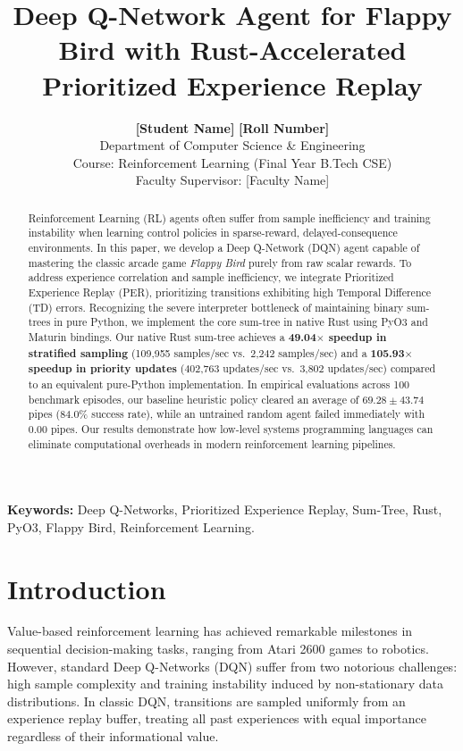 \documentclass[12pt,a4paper]{article}
\title{\textbf{\Large Deep Q-Network Agent for Flappy Bird with Rust-Accelerated Prioritized Experience Replay}}
\author{
    \textbf{[Student Name]} \quad \textbf{[Roll Number]} \\
    Department of Computer Science \& Engineering \\
    Course: Reinforcement Learning (Final Year B.Tech CSE) \\
    Faculty Supervisor: [Faculty Name]
}
\date{}
\begin{document}
\maketitle
\thispagestyle{empty}

\begin{abstract}
Reinforcement Learning (RL) agents often suffer from sample inefficiency and training instability when learning control policies in sparse-reward, delayed-consequence environments. In this paper, we develop a Deep Q-Network (DQN) agent capable of mastering the classic arcade game \textit{Flappy Bird} purely from raw scalar rewards. To address experience correlation and sample inefficiency, we integrate Prioritized Experience Replay (PER), prioritizing transitions exhibiting high Temporal Difference (TD) errors. Recognizing the severe interpreter bottleneck of maintaining binary sum-trees in pure Python, we implement the core sum-tree in native Rust using PyO3 and Maturin bindings. Our native Rust sum-tree achieves a \textbf{49.04$\times$ speedup in stratified sampling} (109,955 samples/sec vs.\ 2,242 samples/sec) and a \textbf{105.93$\times$ speedup in priority updates} (402,763 updates/sec vs.\ 3,802 updates/sec) compared to an equivalent pure-Python implementation. In empirical evaluations across 100 benchmark episodes, our baseline heuristic policy cleared an average of $69.28 \pm 43.74$ pipes (84.0\% success rate), while an untrained random agent failed immediately with $0.00$ pipes. Our results demonstrate how low-level systems programming languages can eliminate computational overheads in modern reinforcement learning pipelines.
\end{abstract}

\vspace{0.5em}
\noindent \textbf{Keywords:} Deep Q-Networks, Prioritized Experience Replay, Sum-Tree, Rust, PyO3, Flappy Bird, Reinforcement Learning.

\section{Introduction}
Value-based reinforcement learning has achieved remarkable milestones in sequential decision-making tasks, ranging from Atari 2600 games to robotics. However, standard Deep Q-Networks (DQN) suffer from two notorious challenges: high sample complexity and training instability induced by non-stationary data distributions. In classic DQN, transitions are sampled uniformly from an experience replay buffer, treating all past experiences with equal importance regardless of their informational value.
\end{document}
